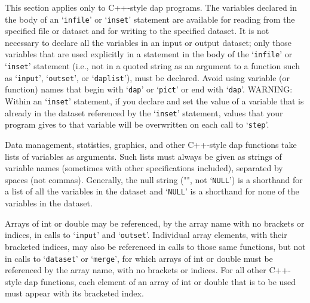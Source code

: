 \documentclass{book}
\renewcommand{\_}{\Texinfounderscore\discretionary{}{}{}}
\begin{document}
This section applies only to C++-style dap programs.
The variables declared in the body of an `\texttt{infile}'
%
or `\texttt{inset}'
%
statement
are available for reading from the specified file or dataset and for
writing to the specified dataset.  It is not necessary to
declare
%
all the variables in an input or output dataset; only those variables
that are used explicitly in a statement in the body of the `\texttt{infile}' or `\texttt{inset}'
statement
(i.e., not in a quoted string as an argument to
a function such as `\texttt{input}', `\texttt{outset}', or `\texttt{dap\_list}'),
must be declared.
%
%
%
%
Avoid using variable (or function) names
%
that begin with
`\texttt{dap\_}' or `\texttt{pict\_}' or end with `\texttt{dap\_}'.
WARNING: Within an `\texttt{inset}' statement, if you declare and set the value
of a variable that is already in the dataset
referenced by the `\texttt{inset}' statement, values that your program gives to
that variable will be overwritten on each call to `\texttt{step}'.
%

Data management, statistics, graphics, and other C++-style dap functions take lists of variables
as arguments.  Such lists must always be given as strings
%
%
of variable names (sometimes with other specifications included), separated by
spaces (not commas).
%
Generally, the null string ("", not `\texttt{NULL}')
%
is a shorthand
for a list of all the variables in the dataset and `\texttt{NULL}'
%
is a shorthand
for none of the variables in the dataset.

Arrays
%
of int or double may be referenced, by the array name with no brackets or indices,
in calls to `\texttt{input}' and
%
`\texttt{outset}'.
%
Individual array elements, with their bracketed indices,
may also be referenced in calls to those same functions, but not in calls to
`\texttt{dataset}'
%
or `\texttt{merge}',
%
for which arrays of int or double must be referenced by the array name,
with no brackets or indices.
For all other C++-style dap functions, each element of an array of
int or double that is to be used must appear with its bracketed index.  
\end{document}
